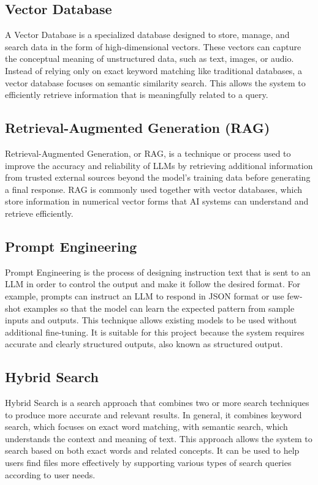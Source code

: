 \documentclass[12pt,oneside,openright,a4paper]{cpe-english-project}
\begin{document}
\subsection{Vector Database}
A Vector Database is a specialized database designed to store, manage, and search data in the form of high-dimensional vectors. These vectors can capture the conceptual meaning of unstructured data, such as text, images, or audio. Instead of relying only on exact keyword matching like traditional databases, a vector database focuses on semantic similarity search. This allows the system to efficiently retrieve information that is meaningfully related to a query.

\subsection{Retrieval-Augmented Generation (RAG)}
Retrieval-Augmented Generation, or RAG, is a technique or process used to improve the accuracy and reliability of LLMs by retrieving additional information from trusted external sources beyond the model's training data before generating a final response. RAG is commonly used together with vector databases, which store information in numerical vector forms that AI systems can understand and retrieve efficiently.

\subsection{Prompt Engineering}
Prompt Engineering is the process of designing instruction text that is sent to an LLM in order to control the output and make it follow the desired format. For example, prompts can instruct an LLM to respond in JSON format or use few-shot examples so that the model can learn the expected pattern from sample inputs and outputs. This technique allows existing models to be used without additional fine-tuning. It is suitable for this project because the system requires accurate and clearly structured outputs, also known as structured output.

\subsection{Hybrid Search}
Hybrid Search is a search approach that combines two or more search techniques to produce more accurate and relevant results. In general, it combines keyword search, which focuses on exact word matching, with semantic search, which understands the context and meaning of text. This approach allows the system to search based on both exact words and related concepts. It can be used to help users find files more effectively by supporting various types of search queries according to user needs.
\end{document}
